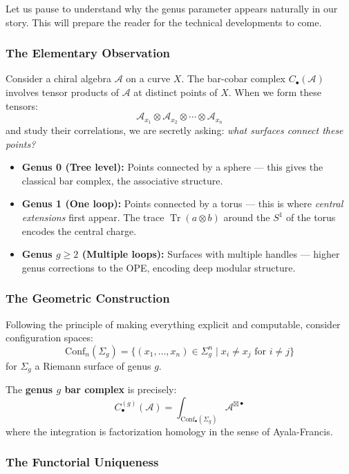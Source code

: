 Let us pause to understand why the genus parameter appears naturally in our story. This will prepare
the reader for the technical developments to come.

\subsubsection{The Elementary Observation}

Consider a chiral algebra $\mathcal{A}$ on a curve $X$. The bar-cobar complex
$C_{\bullet}(\mathcal{A})$ involves tensor products of $\mathcal{A}$ at distinct
points of $X$. When we form these tensors:
$$\mathcal{A}_{x_1} \otimes \mathcal{A}_{x_2} \otimes \cdots \otimes \mathcal{A}_{x_n}$$
and study their correlations, we are secretly asking: \emph{what surfaces connect
these points?}

\begin{itemize}
\item \textbf{Genus 0 (Tree level):} Points connected by a sphere --- this gives
the classical bar complex, the associative structure.

\item \textbf{Genus 1 (One loop):} Points connected by a torus --- this is where
\emph{central extensions} first appear. The trace $\operatorname{Tr}(a \otimes b)$
around the $S^1$ of the torus encodes the central charge.

\item \textbf{Genus $g \geq 2$ (Multiple loops):} Surfaces with multiple handles ---
higher genus corrections to the OPE, encoding deep modular structure.
\end{itemize}

\subsubsection{The Geometric Construction}

Following the principle of making everything explicit and computable,
consider configuration spaces:
$$\mathrm{Conf}_n(\Sigma_g) = \{ (x_1, \ldots, x_n) \in \Sigma_g^n \mid x_i \neq x_j \text{ for } i \neq j \}$$
for $\Sigma_g$ a Riemann surface of genus $g$.

The \textbf{genus $g$ bar complex} is precisely:
$$C_{\bullet}^{(g)}(\mathcal{A}) = \int_{\mathrm{Conf}_{\bullet}(\Sigma_g)} 
\mathcal{A}^{\boxtimes \bullet}$$
where the integration is factorization homology in the sense of Ayala-Francis.

\subsubsection{The Functorial Uniqueness}

